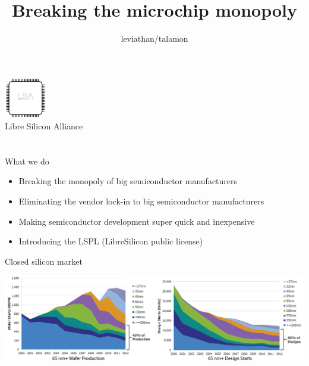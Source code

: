 \documentclass[9pt]{beamer}
\author{leviathan/talamon}
\title{Breaking the microchip monopoly}
\begin{document}
\begin{frame}
	\titlepage
	\begin{center}
		\includegraphics[width=50pt,height=50pt]{lsa.png}
		\\ Libre Silicon Alliance
	\end{center}
\end{frame}


\section[What]{}
\begin{frame}{What we do}
	\begin{itemize}
        \setlength\itemsep{1em}
		\item Breaking the monopoly of big semiconductor manufacturers
		\item Eliminating the vendor lock-in to big semiconductor manufacturers
		\item Making semiconductor development super quick and inexpensive
		\item Introducing the LSPL (LibreSilicon public license)
	\end{itemize}
\end{frame}

\begin{frame}{Closed silicon market}
	\begin{center}
		\hspace*{-0.3in}
		\includegraphics[width=1.15\textwidth]{market-closing.png} \\
	\end{center}
	
\end{frame}
\end{document}
